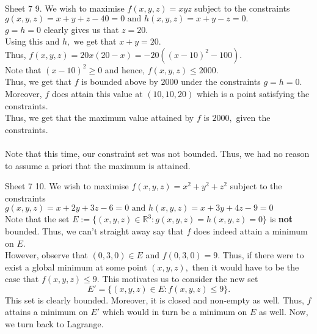 \documentclass[handout, aspectratio=169]{beamer}
\begin{document}
\begin{frame}{Sheet 7}
	9. We wish to maximise $f(x, y, z)=x y z$ subject to the constraints $g(x, y, z) = x+y+z - 40 = 0 \text { and } h(x, y, z) = x+y - z = 0.$\\
	$g = h = 0$ clearly gives us that $z = 20.$\\
	Using this and $h,$ we get that $x + y = 20.$\\
	Thus, $f(x, y, z) = 20x(20 - x) = -20\left((x-10)^2 - 100\right).$\\
	Note that $(x-10)^2\ge0$ and hence, $f(x, y, z) \le 2000.$\\
	Thus, we get that $f$ is bounded above by $2000$ under the constraints $g=h=0.$\\
	Moreover, $f$ does attain this value at $(10, 10, 20)$ which is a point satisfying the constraints.\\
	Thus, we get that the maximum value attained by $f$ is $2000,$ given the constraints.\\~\\
	Note that this time, our constraint set was not bounded. Thus, we had no reason to assume a priori that the maximum is attained.
\end{frame}
\begin{frame}{Sheet 7}
	10. We wish to maximise $f(x, y, z)=x^2 + y^2 + z^2$ subject to the constraints $g(x, y, z) = x+2 y+3 z - 6=0 \text { and }  h(x, y, z) = x+3 y+4 z - 9= 0$\\
	Note that the set $E := \{(x, y, z) \in \mathbb{R}^3 : g(x, y, z) = h(x, y, z) = 0\}$ is \textbf{not} bounded. Thus, we can't straight away say that $f$ does indeed attain a minimum on $E.$\\
	However, observe that $(0, 3, 0) \in E$ and $f(0, 3, 0) = 9.$ Thus, if there were to exist a global minimum at some point $(x, y, z),$ then it would have to be the case that $f(x, y, z) \le 9.$ This motivates us to consider the new set
	\[E' = \{(x, y, z) \in E: f(x, y, z) \le 9\}.\]
	This set is clearly bounded. Moreover, it is closed and non-empty as well. Thus, $f$ attains a minimum on $E'$ which would in turn be a minimum on $E$ as well. Now, we turn back to Lagrange.
\end{frame}
	
\end{document}
